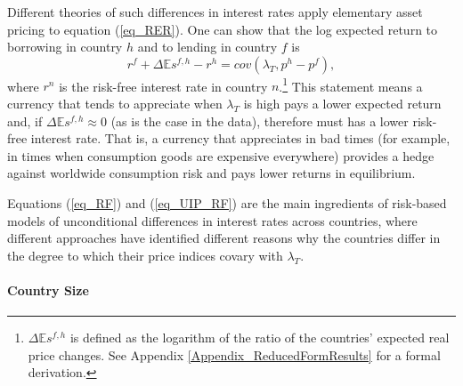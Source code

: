 \documentclass{ar-1col}
\begin{document}
Different theories of such differences in interest rates apply
elementary asset pricing to equation (\ref{eq_RER}). One can show that the log expected return to
borrowing in country $h$ and to lending in country $f$ is
\begin{equation}
  r^{f} + \Delta \mathbb{E} s^{f,h} - r^{h} =cov\left( \lambda _{T},p^{h}-p^{f}\right),
  \label{eq_UIP_RF}
\end{equation}%
where $r^{n}$ is the risk-free interest rate in country $n$.\footnote{$\Delta\mathbb{E}s^{f,h}$ is defined as the
  logarithm of the ratio of the countries' expected real price
  changes. See Appendix \ref{Appendix_ReducedFormResults} for a formal
  derivation.} This statement means a currency that tends to
appreciate when $\lambda_T$ is high pays a lower expected return and,
if $\Delta \mathbb{E} s^{f,h}\approx0$ (as is the case in the data), therefore must has a lower risk-free interest
rate. That is, a currency that appreciates in bad times (for example, in times when
consumption goods are expensive everywhere) provides a
hedge against worldwide consumption risk and pays lower returns in
equilibrium.

Equations (\ref{eq_RF}) and (\ref{eq_UIP_RF}) are the main ingredients
of risk-based models of unconditional differences in interest rates
across countries, where different approaches have identified different reasons why the countries differ in the degree to which their price indices covary with $\lambda_T$.

\paragraph*{Country Size}
\end{document}
